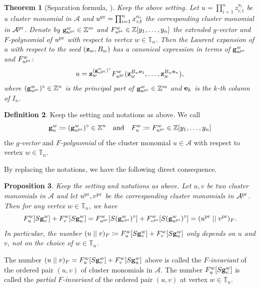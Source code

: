 \documentclass[12pt]{amsart}
\newtheorem{theorem}{Theorem}[section]
\newtheorem{proposition}[theorem]{Proposition}
\theoremstyle{definition}
\newtheorem{definition}[theorem]{Definition}
\theoremstyle{remark}
\numberwithin{equation}{section}
\begin{document}
\begin{theorem}[Separation formula, \cite{fomin_zelevinsky_2007}]
 Keep the above setting. Let $u=\prod_{i=1}^nz_{i;t}^{a_i}$ be a cluster monomial in $\mathcal A$ and $u^{\rm pr}=\prod_{i=1}^nx_{i;t}^{a_i}$ the corresponding cluster monomial in $\mathcal A^{\rm pr}$. Denote by ${\bf g}_{u^{\rm pr}}^w\in\mathbb Z^m$ and $F_{u^{\rm pr}}^w\in\mathbb Z[y_1,\ldots,y_n]$ the extended $g$-vector and $F$-polynomial of $u^{\rm pr}$ with respect to vertex $w\in\mathbb T_n$. Then the Laurent expansion of $u$ with respect to the seed $({\bf z}_w,B_w)$ has a canonical expression in terms of ${\bf g}_{u^{\rm pr}}^w$ and $F_{u^{\rm pr}}^w$: 
 \[ u={\bf z}_w^{({\bf g}_{u^{\rm pr}}^w)^\circ}F_{u^{\rm pr}}^w({\bf z}_w^{B_w{\bf e}_1},\ldots,{\bf z}_w^{B_w{\bf e}_n}),
 \]
 where $({\bf g}_{u^{\rm pr}}^w)^\circ\in\mathbb Z^n$ is the principal part of ${\bf g}_{u^{\rm pr}}^w\in\mathbb Z^m$ and ${\bf e}_k$ is the $k$-th column of $I_n$. 
\end{theorem}
\begin{definition}
    Keep the setting and notations as above. We call 
   \[ {\bf g}_{u}^w \coloneqq   ({\bf g}_{u^{\rm pr}}^w)^\circ\in\mathbb Z^n\quad \text{and}\quad F_{u}^w \coloneqq   F_{u^{\rm pr}}^w\in\mathbb Z[y_1,\ldots,y_n]\] 
    the {\em $g$-vector} and {\em $F$-polynomial} of the cluster monomial $u\in\mathcal A$ with respect to vertex $w\in\mathbb T_n$.
\end{definition}
By replacing the notations, we have the following direct consequence.
\begin{proposition} Keep the setting and notations as above. Let $u,v$ be two cluster monomials in $\mathcal A$ and let $u^{\rm pr},v^{\rm pr}$ be the corresponding cluster monomials in $\mathcal A^{\rm pr}$. Then for any vertex $w\in\mathbb T_n$, we have 
\[ F_{u}^w[S{\bf g}_{v}^w]+ F_{v}^w[S{\bf g}_{u}^w]=F_{u^{\rm pr}}^w[S({\bf g}_{v^{\rm pr}}^w)^\circ]+ F_{v^{\rm pr}}^w[S({\bf g}_{u^{\rm pr}}^w)^\circ]=(u^{\rm pr}\mid\mid v^{\rm pr})_F.
\]
 In particular, the number $(u\mid\mid v)_F\coloneqq F_{u}^w[S{\bf g}_{v}^w]+ F_{v}^w[S{\bf g}_{u}^w]$ only depends on $u$ and $v$, not on the choice of $w\in\mathbb T_n$. 
\end{proposition}
The number $(u\mid\mid v)_F=F_{u}^w[S{\bf g}_{v}^w]+ F_{v}^w[S{\bf g}_{u}^w]$ above is called the {\em $F$-invariant} of the ordered pair $(u, v)$ of cluster monomials in $\mathcal A$. The number $F_{u}^w[S{\bf g}_{v}^w]$ is called the {\em partial $F$-invariant} of the ordered pair $(u, v)$ at vertex $w\in\mathbb T_n$.
\end{document}
